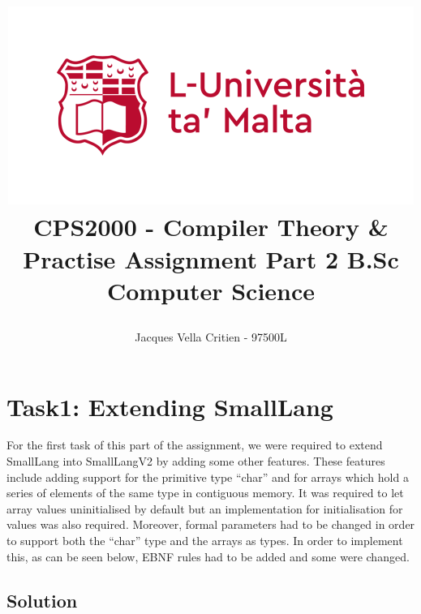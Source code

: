 \documentclass{article}
\newcommand{\quotes}[1]{``#1''}
\begin{document}
			\title{\includegraphics[scale = .6]{uom.png}
				\linebreak 
				\textbf{CPS2000 - Compiler Theory \& Practise}\linebreak\linebreak
				\textbf{Assignment Part 2}\linebreak\linebreak
				\large{B.Sc Computer Science}
				\date{}
				\author{Jacques Vella Critien - 97500L}}
				
				\begin{titlepage}
					\maketitle
					\thispagestyle{empty}
				\end{titlepage}
				
				\tableofcontents
				\newpage
				
				\section{Task1: Extending SmallLang}
				
				For the first task of this part of the assignment, we were required to extend SmallLang into SmallLangV2 by adding some other features. These features include adding support for the primitive type \quotes{char} and for arrays which hold a series of elements of the same type in contiguous memory. It was required to let array values uninitialised by default but an implementation for initialisation for values was also required. Moreover, formal parameters had to be changed in order to support both the \quotes{char} type and the arrays as types. In order to implement this, as can be seen below, EBNF rules had to be added and some were changed.
				
				\subsection{Solution}
				
\end{document}
